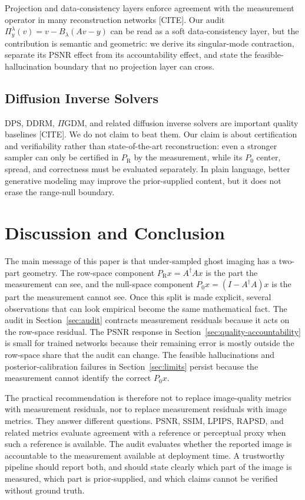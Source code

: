 \documentclass[journal]{IEEEtran}
\newcommand{\pinv}{\dagger}
\newcommand{\PR}{P_{\mathrm{R}}}
\newcommand{\PZ}{P_{0}}
\newcommand{\Audit}{\Pi_y^\lambda}
\newcommand{\Blambda}{B_\lambda}
\begin{document}
Projection and data-consistency layers enforce agreement with the measurement
operator in many reconstruction networks [CITE].  Our audit
$\Audit(v)=v-\Blambda(Av-y)$ can be read as a soft data-consistency layer, but
the contribution is semantic and geometric: we derive its singular-mode
contraction, separate its PSNR effect from its accountability effect, and state
the feasible-hallucination boundary that no projection layer can cross.

\subsection{Diffusion Inverse Solvers}

DPS, DDRM, $\Pi$GDM, and related diffusion inverse solvers are important
quality baselines [CITE].  We do not claim to beat them.  Our claim is about
certification and verifiability rather than state-of-the-art reconstruction:
even a stronger sampler can only be certified in $\PR$ by the measurement, while
its $\PZ$ center, spread, and correctness must be evaluated separately.  In
plain language, better generative modeling may improve the prior-supplied
content, but it does not erase the range-null boundary.

\section{Discussion and Conclusion}
\label{sec:conclusion}

The main message of this paper is that under-sampled ghost imaging has a
two-part geometry.  The row-space component $\PR x=A^\pinv Ax$ is the part the
measurement can see, and the null-space component $\PZ x=(I-A^\pinv A)x$ is the
part the measurement cannot see.  Once this split is made explicit, several
observations that can look empirical become the same mathematical fact.  The
audit in Section~\ref{sec:audit} contracts measurement residuals because it acts
on the row-space residual.  The PSNR response in Section~\ref{sec:quality-accountability}
is small for trained networks because their remaining error is mostly outside
the row-space share that the audit can change.  The feasible hallucinations and
posterior-calibration failures in Section~\ref{sec:limits} persist because the
measurement cannot identify the correct $\PZ x$.

The practical recommendation is therefore not to replace image-quality metrics
with measurement residuals, nor to replace measurement residuals with image
metrics.  They answer different questions.  PSNR, SSIM, LPIPS, RAPSD, and
related metrics evaluate agreement with a reference or perceptual proxy when
such a reference is available.  The audit evaluates whether the reported image
is accountable to the measurement available at deployment time.  A trustworthy
pipeline should report both, and should state clearly which part of the image is
measured, which part is prior-supplied, and which claims cannot be verified
without ground truth.
\end{document}
